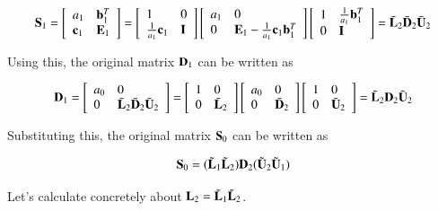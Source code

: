 \begin{eqnarray}
\mathbf{S}_1=\left[\begin{array}{ll}
a_1 & \mathbf{b}^T_1\\ \mathbf{c}_1 & \mathbf{E}_1\end{array}\right]
=
\left[\begin{array}{ll}1 & 0\\ \frac{1}{a_1}\mathbf{c}_1 & \mathbf{I}\end{array}\right]
\left[\begin{array}{ll}a_1 & 0\\ 0 & \mathbf{E}_1 - \frac{1}{a_1}\mathbf{c}_1\mathbf{b}_1^T\end{array}\right]
\left[\begin{array}{ll}1 & \frac{1}{a_1}\mathbf{b}_1^T\\ 0 & \mathbf{I}\end{array}\right]
= \bar{\mathbf{L}}_2 \bar{\mathbf{D}}_2 \bar{\mathbf{U}}_2
\end{eqnarray}

Using this, the original matrix $\mathbf{D}_1$ can be written as

\begin{eqnarray}
\mathbf{D}_1 =
\left[\begin{array}{ll}a_0 & 0\\ 0 & \bar{\mathbf{L}}_2\bar{\mathbf{D}}_2\bar{\mathbf{U}}_2\end{array}\right] =
\left[\begin{array}{ll}1 & 0\\ 0 & \bar{\mathbf{L}}_2\end{array}\right]
\left[\begin{array}{ll}a_0 & 0\\ 0 & \bar{\mathbf{D}}_2\end{array}\right]
\left[\begin{array}{ll}1 & 0\\ 0 & \bar{\mathbf{U}}_2\end{array}\right] = \tilde{\mathbf{L}}_2\mathbf{D}_2\tilde{\mathbf{U}}_2
\end{eqnarray}

Substituting this, the original matrix $\mathbf{S}_0$ can be written as

\begin{equation}
\mathbf{S}_0 = (\tilde{\mathbf{L}}_1 \tilde{\mathbf{L}}_2) \mathbf{D}_2 (\tilde{\mathbf{U}}_2 \tilde{\mathbf{U}}_1)
\end{equation}

Let's calculate concretely about $\mathbf{L}_2=\tilde{\mathbf{L}}_1\tilde{\mathbf{L}}_2$.

